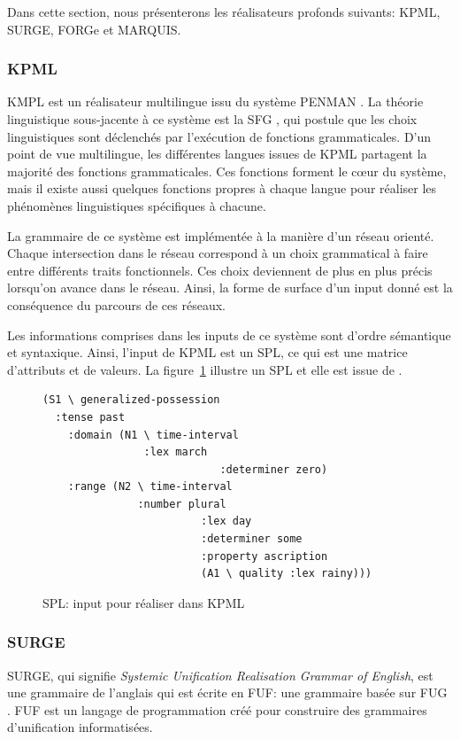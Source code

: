 Dans cette section, nous présenterons les réalisateurs profonds suivants: KPML, SURGE, FORGe et MARQUIS.

\subsubsection{KPML}
KMPL \citep{BatemanEnablingTechnologyMultilingual1997} est un réalisateur multilingue issu du système PENMAN \citep{PenmanOverview}. La théorie linguistique sous-jacente à ce système est la \ac{SFG} \citep{MatthiessenSystemicfunctionalgrammar1997}, qui postule que les choix linguistiques sont déclenchés par l'exécution de fonctions grammaticales. D'un point de vue multilingue, les différentes langues issues de KPML partagent la majorité des fonctions grammaticales. Ces fonctions forment le c\oe{}ur du système, mais il existe aussi quelques fonctions propres à chaque langue pour réaliser les phénomènes linguistiques spécifiques à chacune.

La grammaire de ce système est implémentée à la manière d'un réseau orienté. Chaque intersection dans le réseau correspond à un choix grammatical à faire entre différents traits fonctionnels. Ces choix deviennent de plus en plus précis lorsqu'on avance dans le réseau. Ainsi, la forme de surface d'un input donné est la conséquence du parcours de ces réseaux.

Les informations comprises dans les inputs de ce système sont d'ordre sémantique et syntaxique. Ainsi, l'input de KPML est un \ac{SPL}, ce qui est une matrice d'attributs et de valeurs. La figure~\ref{kpml} illustre un \ac{SPL} et elle est issue de \cite{ReiterBuildingNaturalLanguage2000}.

\begin{figure}[htb]
\begin{lstlisting}[language=mate]
(S1 \ generalized-possession
  :tense past 
	:domain (N1 \ time-interval
	            :lex march
							:determiner zero)
	:range (N2 \ time-interval
	           :number plural
						 :lex day
						 :determiner some
						 :property ascription
						 (A1 \ quality :lex rainy)))
\end{lstlisting}
\caption{SPL: input pour réaliser  dans KPML}
\label{kpml}
\end{figure}

\subsubsection{SURGE}
SURGE, qui signifie \emph{Systemic Unification Realisation Grammar of English}, est une grammaire de l'anglais \citep{Elhadad98surge:a} qui est écrite en \ac{FUF}: une grammaire basée sur \acf{FUG} \citep{KayFunctionalUnificationGrammar1984}. \ac{FUF} est un langage de programmation créé pour construire des grammaires d'unification informatisées.

